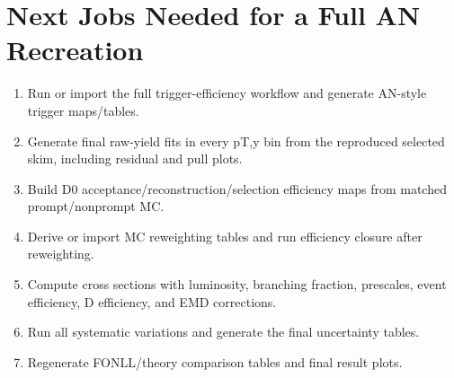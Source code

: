 \documentclass[11pt]{article}
\begin{document}
\section*{Next Jobs Needed for a Full AN Recreation}
\begin{enumerate}
\item Run or import the full trigger-efficiency workflow and generate AN-style trigger maps/tables.
\item Generate final raw-yield fits in every pT,y bin from the reproduced selected skim, including residual and pull plots.
\item Build D0 acceptance/reconstruction/selection efficiency maps from matched prompt/nonprompt MC.
\item Derive or import MC reweighting tables and run efficiency closure after reweighting.
\item Compute cross sections with luminosity, branching fraction, prescales, event efficiency, D efficiency, and EMD corrections.
\item Run all systematic variations and generate the final uncertainty tables.
\item Regenerate FONLL/theory comparison tables and final result plots.
\end{enumerate}
\end{document}
